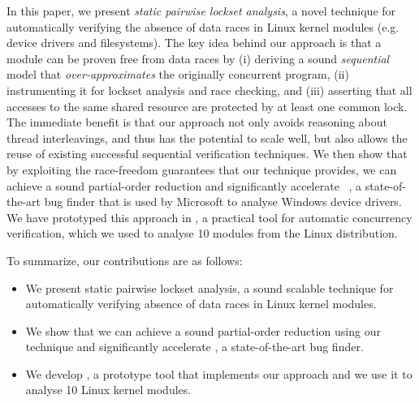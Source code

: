 In this paper, we present \emph{static pairwise lockset analysis}, a novel technique for automatically verifying the absence of data races in Linux kernel modules (e.g. device drivers and filesystems). The key idea behind our approach is that a module can be proven free from data races by (i) deriving a sound \emph{sequential} model that \emph{over-approximates} the originally concurrent program, (ii) instrumenting it for lockset analysis and race checking, and (iii) asserting that all accesses to the same shared resource are protected by at least one common lock. The immediate benefit is that our approach not only avoids reasoning about thread interleavings, and thus has the potential to scale well, but also allows the reuse of existing successful sequential verification techniques. We then show that by exploiting the race-freedom guarantees that our technique provides, we can achieve a sound partial-order reduction and significantly accelerate \corral~\cite{lal2012solver}, a state-of-the-art bug finder that is used by Microsoft to analyse Windows device drivers. We have prototyped this approach in \whoop, a practical tool for automatic concurrency verification, which we used to analyse 10 modules from the Linux distribution.

To summarize, our contributions are as follows:
\begin{itemize}
\item We present static pairwise lockset analysis,  a sound scalable technique for automatically verifying absence of data races in Linux kernel modules.
\item We show that we can achieve a sound partial-order reduction using our technique and significantly accelerate \corral, a state-of-the-art bug finder.
\item We develop \whoop, a prototype tool that implements our approach and we use it to analyse 10 Linux kernel modules.
\end{itemize}